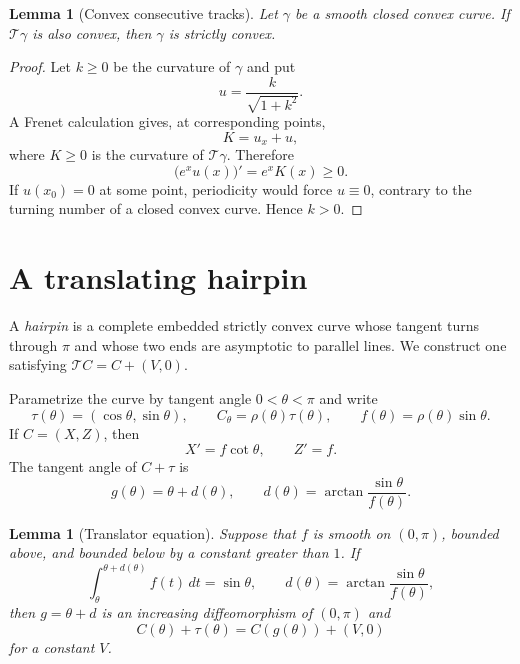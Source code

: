 \documentclass[11pt]{article}
\newtheorem{lemma}[theorem]{Lemma}
\theoremstyle{remark}
\newcommand{\Tmap}{\mathcal T}
\begin{document}
\begin{lemma}[Convex consecutive tracks]\label{lem:strictness}
Let $\gamma$ be a smooth closed convex curve.  If $\Tmap\gamma$ is also
convex, then $\gamma$ is strictly convex.
\end{lemma}

\begin{proof}
Let $k\geq0$ be the curvature of $\gamma$ and put
\[
  u=\frac{k}{\sqrt{1+k^2}}.
\]
A Frenet calculation gives, at corresponding points,
\[
  K=u_x+u,
\]
where \(K\geq0\) is the curvature of \(\Tmap\gamma\).  Therefore
\[
   \bigl(e^x u(x)\bigr)'=e^xK(x)\geq0.
\]
If \(u(x_0)=0\) at some point, periodicity would force \(u\equiv0\),
contrary to the turning number of a closed convex curve.  Hence \(k>0\).
\end{proof}

\section{A translating hairpin}\label{sec:translator}

A \emph{hairpin} is a complete embedded strictly convex curve whose tangent
turns through \(\pi\) and whose two ends are asymptotic to parallel lines.  We
construct one satisfying \(\Tmap C=C+(V,0)\).

Parametrize the curve by tangent angle $0<\theta<\pi$ and write
\[
  \tau(\theta)=(\cos\theta,\sin\theta),
  \qquad
  C_\theta=\rho(\theta)\tau(\theta),
  \qquad
  f(\theta)=\rho(\theta)\sin\theta.
\]
If $C=(X,Z)$, then
\begin{equation}\label{eq:XZ}
  X'=f\cot\theta,
  \qquad
  Z'=f.
\end{equation}
The tangent angle of $C+\tau$ is
\[
  g(\theta)=\theta+d(\theta),
  \qquad
  d(\theta)=\arctan\frac{\sin\theta}{f(\theta)}.
\]

\begin{lemma}[Translator equation]\label{lem:translator-equation}
Suppose that $f$ is smooth on $(0,\pi)$, bounded above, and bounded below by a
constant greater than $1$.  If
\begin{equation}\label{eq:translator-integral}
  \int_\theta^{\theta+d(\theta)}f(t)\,dt=\sin\theta,
  \qquad
  d(\theta)=\arctan\frac{\sin\theta}{f(\theta)},
\end{equation}
then $g=\theta+d$ is an increasing diffeomorphism of $(0,\pi)$ and
\begin{equation}\label{eq:translator-vector}
  C(\theta)+\tau(\theta)=C(g(\theta))+(V,0)
\end{equation}
for a constant $V$.
\end{lemma}
\end{document}
